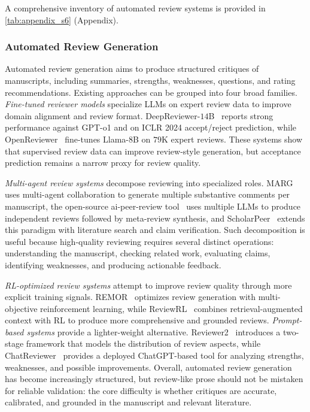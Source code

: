 \documentclass{llmxive}
\begin{document}
A comprehensive inventory of automated review systems is provided in \cref{tab:appendix_s6} (Appendix).



\subsubsection{Automated Review Generation}
\label{sec:review_gen}

Automated review generation aims to produce structured critiques of manuscripts, including summaries, strengths, weaknesses, questions, and rating recommendations. Existing approaches can be grouped into four broad families. \emph{Fine-tuned reviewer models} specialize LLMs on expert review data to improve domain alignment and review format. DeepReviewer-$14$B~\cite{deepreviewer2025} reports strong performance against GPT-o1 and on ICLR 2024 accept/reject prediction, while OpenReviewer~\cite{openreviewer2025} fine-tunes Llama-$8$B on $79$K expert reviews. These systems show that supervised review data can improve review-style generation, but acceptance prediction remains a narrow proxy for review quality.

\emph{Multi-agent review systems} decompose reviewing into specialized roles. MARG~\cite{darcy2024marg} uses multi-agent collaboration to generate multiple substantive comments per manuscript, the open-source ai-peer-review tool~\cite{poldrack2024aireview} uses multiple LLMs to produce independent reviews followed by meta-review synthesis, and ScholarPeer~\cite{scholarpeer2026} extends this paradigm with literature search and claim verification. Such decomposition is useful because high-quality reviewing requires several distinct operations: understanding the manuscript, checking related work, evaluating claims, identifying weaknesses, and producing actionable feedback.

\emph{RL-optimized review systems} attempt to improve review quality through more explicit training signals. REMOR~\cite{remor2025} optimizes review generation with multi-objective reinforcement learning, while ReviewRL~\cite{reviewrl2025} combines retrieval-augmented context with RL to produce more comprehensive and grounded reviews. \emph{Prompt-based systems} provide a lighter-weight alternative. Reviewer2~\cite{reviewer2024} introduces a two-stage framework that models the distribution of review aspects, while ChatReviewer~\cite{chatreviewer2023} provides a deployed ChatGPT-based tool for analyzing strengths, weaknesses, and possible improvements. Overall, automated review generation has become increasingly structured, but review-like prose should not be mistaken for reliable validation: the core difficulty is whether critiques are accurate, calibrated, and grounded in the manuscript and relevant literature.
\end{document}
